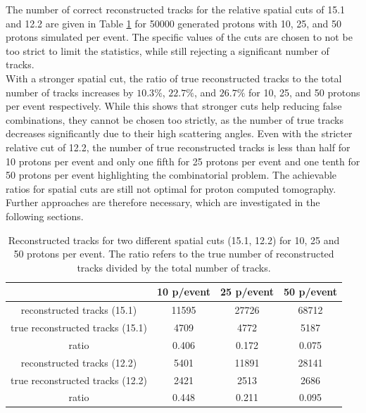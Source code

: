 The number of correct reconstructed tracks for the relative spatial cuts of 15.1 and 12.2 are given in Table
\ref{tab:true_tracks} for 50000 generated protons with 10,
25, and 50 protons simulated per event. The specific values of the cuts are chosen to not be too strict to limit the statistics, while still rejecting a significant number
of tracks.\\
With a stronger spatial cut,  the ratio of true reconstructed tracks to
the total number of tracks increases by $10.3\%$, $22.7\%$, and $26.7\%$ for 10, 25, and 50 protons per event respectively.
While this shows that stronger cuts help reducing false combinations, they cannot be chosen too strictly,
as the number of true tracks decreases significantly due to their high scattering angles. Even with the stricter relative cut of 12.2, the
number of true reconstructed tracks is less than half for 10 protons per event and only one fifth for 25 protons per event and one tenth for 50 protons per event highlighting the combinatorial problem. The achievable ratios for spatial cuts are still not optimal for proton computed tomography.
Further approaches are therefore necessary, which are investigated in the following sections.

\begin{table}
  \centering
  \caption{Reconstructed tracks for two different spatial cuts (15.1, 12.2) for 10, 25 and 50 protons per event. The ratio refers to the true
  number of reconstructed tracks divided by the total number of tracks.}
  \begin{tabular}{c | c c c}
    \toprule
     & 10 p/event & 25 p/event & 50 p/event \\
    \midrule
    reconstructed tracks (15.1) & 11595 & 27726 & 68712  \\
    true reconstructed tracks (15.1) & 4709 & 4772  & 5187 \\
    ratio & 0.406 & 0.172 & 0.075 \\
    \midrule
    reconstructed tracks (12.2) & 5401 & 11891 & 28141 \\
    true reconstructed tracks (12.2) &  2421 &2513  & 2686 \\
    ratio & 0.448 & 0.211 & 0.095
  \end{tabular}
  \label{tab:true_tracks}
\end{table}


